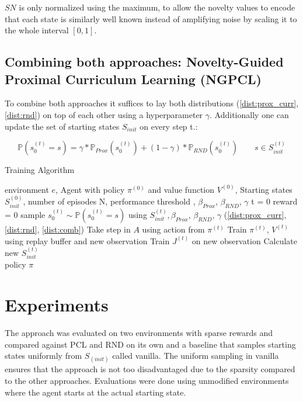 \documentclass{article}
\begin{document}
$SN$ is only normalized using the maximum, to allow the novelty values to encode that each state is similarly well known instead of amplifying noise by scaling it to the whole interval $[0, 1]$.

\subsection{Combining both approaches: Novelty-Guided Proximal Curriculum Learning (NGPCL)}
\label{sec:comb}

To combine both approaches it suffices to lay both distributions (\cref{dist:prox_curr}, \cref{dist:rnd}) on top of each other using a hyperparameter $\gamma$. Additionally one can update the set of starting states $S_{init}$ on every step t.:

\begin{equation}\label{dist:comb}
  \mathbb{P}(s_0^{(t)} = s) = \gamma * \mathbb{P}_{Prox}(s_0^{(t)}) + (1 - \gamma) * \mathbb{P}_{RND}(s_0^{(t)}) \qquad s \in S_{init}^{(t)}
\end{equation}

\begin{algorithm}[H]
    \caption{Training Algorithm}
    \label{alg:code}
    \begin{algorithmic}
      \Require environment $e$, Agent with policy $\pi^{(0)}$ and value function $V^{(0)}$, Starting states $S_{init}^{(0)}$, number of episodes N, performance threshold \eta, $\beta_{Prox}$, $\beta_{RND}$, $\gamma$
        \State t = 0
        \State reward = 0
        \State sample $s_0^{(t)} \sim \mathbb{P}(s_0^{(t)} = s)$ using $S_{init}^{(t)}, \beta_{Prox}$, $\beta_{RND}$, $\gamma$ (\cref{dist:prox_curr}, \cref{dist:rnd}, \cref{dist:comb})
          \State Take step in $A$ using action from $\pi^{(t)}$
          \State Train $\pi^{(t)}$, $V^{(t)}$ using replay buffer and new observation
          \State Train $J^{(t)}$ on new observation
          \State Calculate new $S_{init}^{(t)}$
        \EndWhile \\
        \Return policy $\pi$
    \end{algorithmic}
\end{algorithm}


\section{Experiments}
\label{sec:experiments}
The approach was evaluated on two environments with sparse rewards and compared against PCL and RND on its own and a baseline that samples starting states uniformly from $S_{(init)}$ called vanilla. The uniform sampling in vanilla ensures that the approach is not too disadvantaged due to the sparsity compared to the other approaches. Evaluations were done using unmodified environments where the agent starts at the actual starting state.
\end{document}

